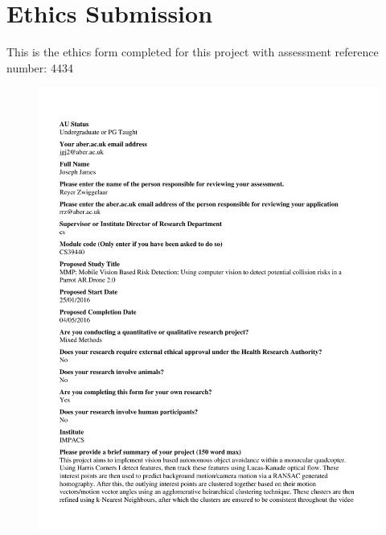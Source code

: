 \chapter{Ethics Submission}
This is the ethics form completed for this project with assessment reference number: 4434\\
\begin{figure}
\includegraphics[scale=0.65]{Appendix2/4434.pdf}
\end{figure}
\clearpage
